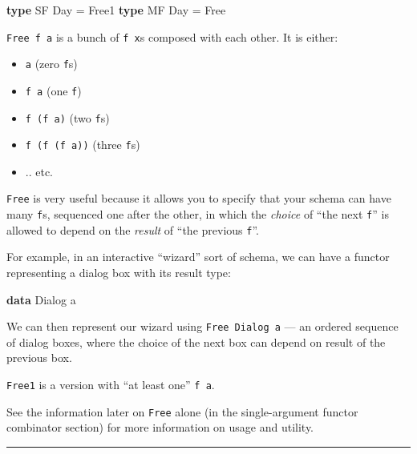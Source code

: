 \documentclass[]{article}
\newenvironment{Shaded}{}{}
\newcommand{\DataTypeTok}[1]{\textcolor[rgb]{0.56,0.13,0.00}{#1}}
\newcommand{\KeywordTok}[1]{\textcolor[rgb]{0.00,0.44,0.13}{\textbf{#1}}}
\newcommand{\NormalTok}[1]{#1}
\newcommand{\OtherTok}[1]{\textcolor[rgb]{0.00,0.44,0.13}{#1}}
\begin{document}
\begin{itemize}
\begin{Shaded}
\begin{Highlighting}[]
\KeywordTok{type} \DataTypeTok{SF} \DataTypeTok{Day} \OtherTok{=} \DataTypeTok{Free1}
\KeywordTok{type} \DataTypeTok{MF} \DataTypeTok{Day} \OtherTok{=} \DataTypeTok{Free}
\end{Highlighting}
\end{Shaded}

  \texttt{Free\ f\ a} is a bunch of \texttt{f\ x}s composed with each other. It
  is either:

  \begin{itemize}
  \tightlist
  \item
    \texttt{a} (zero \texttt{f}s)
  \item
    \texttt{f\ a} (one \texttt{f})
  \item
    \texttt{f\ (f\ a)} (two \texttt{f}s)
  \item
    \texttt{f\ (f\ (f\ a))} (three \texttt{f}s)
  \item
    .. etc.
  \end{itemize}

  \texttt{Free} is very useful because it allows you to specify that your schema
  can have many \texttt{f}s, sequenced one after the other, in which the
  \emph{choice} of ``the next \texttt{f}'' is allowed to depend on the
  \emph{result} of ``the previous \texttt{f}''.

  For example, in an interactive ``wizard'' sort of schema, we can have a
  functor representing a dialog box with its result type:

\begin{Shaded}
\begin{Highlighting}[]
\KeywordTok{data} \DataTypeTok{Dialog}\NormalTok{ a}
\end{Highlighting}
\end{Shaded}

  We can then represent our wizard using \texttt{Free\ Dialog\ a} --- an ordered
  sequence of dialog boxes, where the choice of the next box can depend on
  result of the previous box.

  \texttt{Free1} is a version with ``at least one'' \texttt{f\ a}.

  See the information later on \texttt{Free} alone (in the single-argument
  functor combinator section) for more information on usage and utility.
\end{itemize}

\begin{center}\rule{0.5\linewidth}{\linethickness}\end{center}
\end{document}
